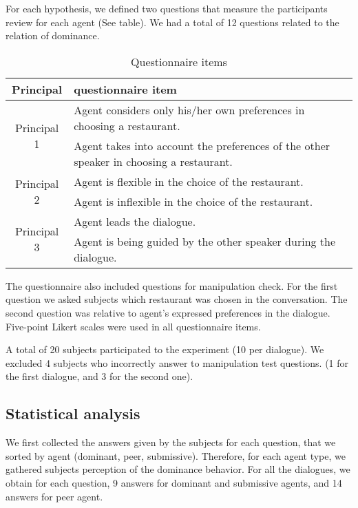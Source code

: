 \documentclass{llncs}
\begin{document}
For each hypothesis, we defined two questions that measure the participants review for each agent (See table). We had a total of 12 questions related to the relation of dominance.

\begin{table}[t]
	\centering
	\begin{tabular}{|c|l|} 
		\hline
		Principal & questionnaire item\\
		\hline
		 \multirow{2}{*}{Principal 1} & Agent considers only his/her own preferences in choosing a restaurant. \\ \cline{2-2}
		 							  & Agent takes into account the preferences of the other speaker in choosing a restaurant. \\
		\hline	
		\multirow{2}{*}{Principal 2} & Agent is flexible in the choice of the restaurant. \\ \cline{2-2}
									 & Agent is inflexible in the choice of the restaurant. \\ 
		\hline
		\multirow{2}{*}{Principal 3} & Agent leads the dialogue. \\ \cline{2-2}
									 &  Agent is being guided by the other speaker during the dialogue.\\ 
		\hline
	\end{tabular} 
	\caption{\label{table2} Questionnaire items}
\end{table}

The questionnaire also included  questions for manipulation check. For the first question we asked subjects which restaurant was chosen in the conversation. The second question was relative to agent's expressed preferences in the dialogue. Five-point Likert scales were used in all questionnaire items.

A total of 20 subjects participated to the experiment (10 per dialogue). We excluded 4 subjects who incorrectly answer to manipulation test questions. (1 for the first dialogue, and 3 for the second one).
\subsection{Statistical analysis}

We first collected the answers given by the subjects for each question, that we sorted by agent (dominant, peer, submissive). Therefore, for each agent type, we gathered subjects perception of the dominance behavior. For all the dialogues, we obtain for each question, 9 answers for dominant and submissive agents, and 14 answers for peer agent. 
\end{document}
